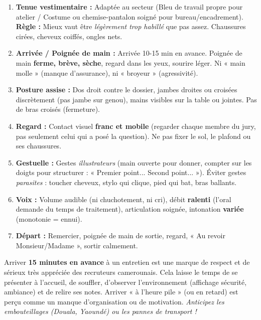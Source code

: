\documentclass[11pt]{article}
\begin{document}
\begin{methode}
\begin{enumerate}
    \item \textbf{Tenue vestimentaire :} Adaptée au secteur (Bleu de travail propre pour atelier / Costume ou chemise-pantalon soigné pour bureau/encadrement). \textbf{Règle :} Mieux vaut être \emph{légèrement trop habillé} que pas assez. Chaussures cirées, cheveux coiffés, ongles nets.
    \item \textbf{Arrivée / Poignée de main :} Arrivée 10-15 min en avance. Poignée de main \textbf{ferme, brève, sèche}, regard dans les yeux, sourire léger. Ni « main molle » (manque d'assurance), ni « broyeur » (agressivité).
    \item \textbf{Posture assise :} Dos droit contre le dossier, jambes droites ou croisées discrètement (pas jambe sur genou), mains visibles sur la table ou jointes. Pas de bras croisés (fermeture).
    \item \textbf{Regard :} Contact visuel \textbf{franc et mobile} (regarder chaque membre du jury, pas seulement celui qui a posé la question). Ne pas fixer le sol, le plafond ou ses chaussures.
    \item \textbf{Gestuelle :} Gestes \emph{illustrateurs} (main ouverte pour donner, compter sur les doigts pour structurer : « Premier point... Second point... »). Éviter gestes \emph{parasites} : toucher cheveux, stylo qui clique, pied qui bat, bras ballants.
    \item \textbf{Voix :} Volume audible (ni chuchotement, ni cri), débit \textbf{ralenti} (l'oral demande du temps de traitement), articulation soignée, intonation \textbf{variée} (monotonie = ennui).
    \item \textbf{Départ :} Remercier, poignée de main de sortie, regard, « Au revoir Monsieur/Madame », sortir calmement.
\end{enumerate}
\end{methode}

\begin{savaistu}
Arriver \textbf{15 minutes en avance} à un entretien est une marque de respect et de sérieux très appréciée des recruteurs camerounais. Cela laisse le temps de se présenter à l'accueil, de souffler, d'observer l'environnement (affichage sécurité, ambiance) et de relire ses notes. Arriver « à l'heure pile » (ou en retard) est perçu comme un manque d'organisation ou de motivation. \emph{Anticipez les embouteillages (Douala, Yaoundé) ou les pannes de transport !}
\end{savaistu}
\end{document}
